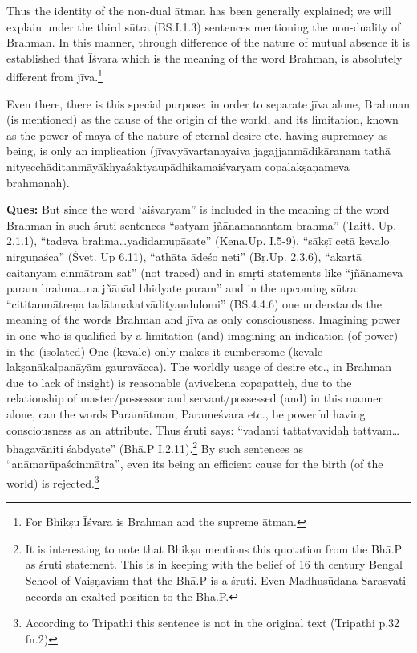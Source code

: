 Thus the identity of the non-dual ātman has been generally explained; we will explain under the third sūtra (BS.I.1.3) sentences mentioning the non-duality of Brahman. In this manner, through difference of the nature of mutual absence it is established that Īśvara which is the meaning of the word Brahman, is absolutely different from jīva.\footnote{For Bhikṣu Īśvara is Brahman and the supreme ātman.} 

Even there, there is this special purpose: in order to separate jīva alone, Brahman (is mentioned) as the cause of the origin of the world, and its limitation, known as the power of māyā of the nature of eternal desire etc. having supremacy as being, is only an implication (jīvavyāvartanayaiva jagajjanmādikāraṇam tathā nityecchāditanmāyākhyaśak\-\break\hbox{tyau\-pādhikamaiśvaryam} copalakṣaṇameva brahmaṇaḥ).


\textbf{Ques:} But since the word ‘aiśvaryam” is included in the meaning of the word Brahman in such śruti sentences “satyam jñānamanantam brahma” (Taitt. Up. 2.1.1), “tadeva brahma…yadidamupāsate”  (Kena.\break Up. I.5-9), “sākṣī cetā kevalo nirguṇaśca” (Śvet. Up 6.11), “athāta ādeśo neti” (Bṛ.Up. 2.3.6), “akartā caitanyam cinmātram sat” (not traced) and in smṛti statements like “jñānameva param brahma…na jñānād bhidyate param” and in the upcoming sūtra: “cititanmātreṇa tadātmakatvādityaudulomi” (BS.4.4.6) one understands the meaning of the words Brahman and jīva as only consciousness. Imagining power in one who  is qualified by a limitation (and) imagining an indication (of power) in the (isolated) One (kevale) only makes it cumbersome (kevale lakṣaṇākalpanāyām gauravācca). The worldly usage of desire etc., in Brahman due to lack of insight) is reasonable (avivekena copapatteḥ, due to the relationship of master/possessor and servant/possessed (and) in this manner alone, can the words Paramātman, Parameśvara etc., be powerful having consciousness as an attribute. Thus śruti says: “vadanti tattatvavidaḥ tattvam…bhagavāniti śabdyate” (Bhā.P I.2.11).\footnote{It is interesting to note that Bhikṣu mentions this quotation from the Bhā.P as śruti statement. This is in keeping with the belief of 16 th century Bengal School of Vaiṣṇavism that the Bhā.P is a śruti. Even Madhusūdana Sarasvati accords an exalted position to the Bhā.P.} By such sentences as “anāmarūpaścinmātra”, even its being an efficient cause for the birth (of the world) is rejected.\footnote{According to Tripathi this sentence is not in the original text (Tripathi p.32 fn.2)} 


